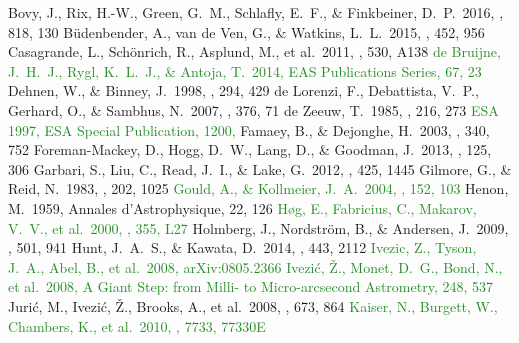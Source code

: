 \documentclass[iop,revtex4]{emulateapj}
\newcommand{\NEW}[1]{\textcolor{ForestGreen}{#1}}
\begin{document}
\begin{thebibliography}{}
 Bovy, J., Rix, H.-W., 
Green, G.~M., Schlafly, E.~F., \& Finkbeiner, D.~P.\ 2016, \apj, 818, 130 
 B{\"u}denbender, A., van de Ven, G., \& Watkins, L.~L.\ 2015, \mnras, 452, 956 
 Casagrande, L., Sch{\"o}nrich, R., Asplund, M., et al.\ 2011, \aap, 530, A138 
 \NEW{de Bruijne, J.~H.~J., Rygl, K.~L.~J., \& Antoja, T.\ 2014, EAS Publications Series, 67, 23}
 Dehnen, W., \& Binney, J.\ 1998, \mnras, 294, 429 
 de Lorenzi, F., Debattista, V.~P., Gerhard, O., \& Sambhus, N.\ 2007, \mnras, 376, 71 
 de Zeeuw, T.\ 1985, \mnras, 216, 273 
 \NEW{ESA 1997, ESA Special Publication, 1200,}
 Famaey, B., \& Dejonghe, H.\ 2003, \mnras, 340, 752 
 Foreman-Mackey, D., Hogg, D.~W., Lang, D., \& Goodman, J.\ 2013, \pasp, 125, 306
 Garbari, S., Liu, C., Read, J.~I., \& Lake, G.\ 2012, \mnras, 425, 1445 
 Gilmore, G., \& Reid, N.\ 1983, \mnras, 202, 1025 
 \NEW{Gould, A., \& Kollmeier, J.~A.\ 2004, \apjs, 152, 103}
 Henon, M.\ 1959, Annales d'Astrophysique, 22, 126 
 \NEW{H{\o}g, E., Fabricius, C., Makarov, V.~V., et al.\ 2000, \aap, 355, L27}
 Holmberg, J., Nordstr{\"o}m, B., \& Andersen, J.\ 2009, \aap, 501, 941 
 Hunt, J.~A.~S., \& Kawata, D.\ 2014, \mnras, 443, 2112 
 \NEW{Ivezic, Z., Tyson, J.~A., Abel, B., et al.\ 2008, arXiv:0805.2366}
 \NEW{Ivezi{\'c}, {\v Z}., Monet, D.~G., Bond, N., et al.\ 2008, A Giant Step: from Milli- to Micro-arcsecond Astrometry, 248, 537}
 Juri{\'c}, M., Ivezi{\'c}, {\v Z}., Brooks, A., et al.\ 2008, \apj, 673, 864
 \NEW{Kaiser, N., Burgett, W., Chambers, K., et al.\ 2010, \procspie, 7733, 77330E}

\end{thebibliography}
\end{document}
